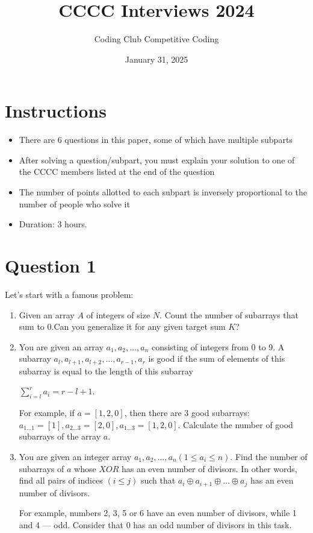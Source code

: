 \documentclass[a4paper,12pt]{article}
\title{\textbf{CCCC Interviews 2024}}
\author{Coding Club Competitive Coding}
\date{January 31, 2025}
\begin{document}
\maketitle
\hrulefill

\section*{Instructions}
\begin{itemize}
    \item There are 6 questions in this paper, some of which have multiple subparts
    \item After solving a question/subpart, you must explain your solution to one of the CCCC members listed at the end of the question
    \item The number of points allotted to each subpart is inversely proportional to the number of people who solve it
    \item Duration: 3 hours.
\end{itemize}

\hrulefill

\section*{Question 1}
Let's start with a famous problem:

\begin{enumerate}[label=\alph*)]
    \item Given an array $A$ of integers of size $N$. Count the number of subarrays that sum to $0$.Can you generalize it for any given target sum $K$?

\item You are given an array $a_1, a_2, \dots, a_n$ consisting of integers from $0$ to $9$. A subarray $a_l, a_{l+1}, a_{l+2}, \dots, a_{r-1}, a_r$ is good if the sum of elements of this subarray is equal to the length of this subarray
    \begin {center}
    $\sum_{i=l}^{r}a_i = r - l + 1$.
    \end {center}
    For example, if $a = [1, 2, 0]$, then there are $3$ good subarrays: $a_{1 \dots 1} = [1], a_{2 \dots 3} = [2, 0], a_{1 \dots 3}=[1, 2, 0]$. Calculate the number of good subarrays of the array $a$.

\item You are given an integer array $a_1, a_2, \dots, a_n (1 \le a_i \le n)$. Find the number of subarrays of $a$ whose $XOR$ has an even number of divisors. In other words, find all pairs of indices $(i \le j)$ such that $a_i \oplus a_{i+1} \oplus \dots \oplus a_j$ has an even number of divisors.

For example, numbers 2, 3, 5 or 6 have an even number of divisors, while 1 and 4 — odd. Consider that 0 has an odd number of divisors in this task.
\end{enumerate}
\end{document}
